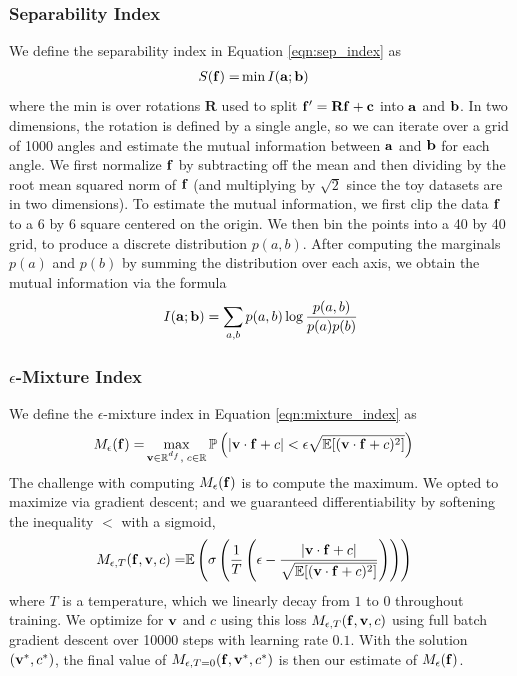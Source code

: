 \documentclass{article} %
\theoremstyle{plain}
\theoremstyle{definition}
\begin{document}
\subsubsection{Separability Index}
We define the separability index in Equation \ref{eqn:sep_index} as
\begin{align*}
S({\mathbf f}) =& \min I({\mathbf a}; {\mathbf b})
\end{align*}
where the min is over rotations $\mathbf{R}$ used to split ${\mathbf f}' = \mathbf{R}{\mathbf f} + {\mathbf c}$ into ${\mathbf a}$ and ${\mathbf b}$. In two dimensions, the rotation is defined by a single angle, so we can iterate over a grid of 1000 angles and estimate the mutual information between ${\mathbf a}$ and ${\mathbf b}$ for each angle. We first normalize ${\mathbf f}$ by subtracting off the mean and then dividing by the root mean squared norm of ${\mathbf f}$ (and multiplying by $\sqrt{2}$ since the toy datasets are in two dimensions). To estimate the mutual information, we first clip the data ${\mathbf f}$ to a 6 by 6 square centered on the origin. We then bin the points into a 40 by 40 grid, to produce a discrete distribution $p(a,b)$. After computing the marginals $p(a)$ and $p(b)$ by summing the distribution over each axis, we obtain the mutual information via the formula
\begin{align}
I({\mathbf a}; {\mathbf b}) = \sum_{a,b} p(a,b) \log \frac{p(a,b)}{p(a)p(b)}
\end{align}

\subsubsection{$\epsilon$-Mixture Index}
We define the $\epsilon$-mixture index in Equation  \ref{eqn:mixture_index} as
\begin{align*}
        M_\epsilon({\mathbf f}) =& \max_{\mathbf{v} \in \mathbb{R}^{d_f},\; c \in \mathbb{R}} \mathbb{P}\left(|\mathbf{v}\cdot {\mathbf f} + c| < \epsilon\sqrt{\mathbb{E}[(\mathbf{v}\cdot {\mathbf f} + c)^2]}\right)
\end{align*}
The challenge with computing $M_\epsilon({\mathbf f})$ is to compute the maximum. We opted to maximize via gradient descent; and we guaranteed differentiability by softening the inequality $<$ with a sigmoid,
\begin{align}
        M_{\epsilon,T}({\mathbf f}, \mathbf{v}, c) =& \mathbb{E}\left(\sigma\left(\frac{1}{T}\left(\epsilon - \frac{|\mathbf{v}\cdot {\mathbf f} + c|}{\sqrt{\mathbb{E}[(\mathbf{v}\cdot {\mathbf f} + c)^2]}}\right)\right)\right)
\end{align}
where $T$ is a temperature, which we linearly decay from $1$ to $0$ throughout training. We optimize for $\mathbf{v}$ and $c$ using this loss $M_{\epsilon,T}({\mathbf f}, \mathbf{v}, c)$ using full batch gradient descent over 10000 steps with learning rate $0.1$. With the solution $(\mathbf{v}^*, c^*)$, the final value of $M_{\epsilon,T=0}({\mathbf f}, \mathbf{v}^*, c^*)$ is then our estimate of $M_\epsilon({\mathbf f})$.
\end{document}
